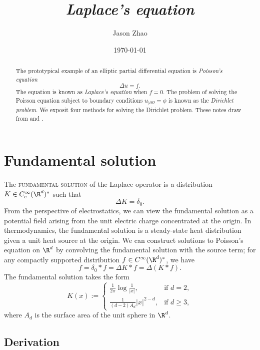 \documentclass[reqno]{amsart}
\title
{
	\emph{Laplace's equation}
}
\author{Jason Zhao}
\date{\today}
\theoremstyle{definition}
\theoremstyle{remark}
\renewcommand{\emph}{\textsc}
\begin{document}
\maketitle

\begin{abstract}
	The prototypical example of an elliptic partial differential equation is \textit{Poisson's equation}
		\[ \Delta u = f. \]
	The equation is known as \textit{Laplace's equation} when $f = 0$. The problem of solving the Poisson equation subject to boundary conditions $u_{|\partial \Omega} = \phi$ is known as the \textit{Dirichlet problem}. We exposit four methods for solving the Dirichlet problem. These notes draw from \cite{GilbargTrudinger2001} and \cite{Evans2010}.
\end{abstract}

\tableofcontents

\section{Fundamental solution}

The \emph{fundamental solution} of the Laplace operator is a distribution $K \in C^\infty_c (\R^d)^*$ such that 
	\[ \Delta K = \delta_0. \]
From the perspective of electrostatics, we can view the fundamental solution as a potential field arising from the unit electric charge concentrated at the origin. In thermodynamics, the fundamental solution is a steady-state heat distribution given a unit heat source at the origin. We can construct solutions to Poisson's equation on $\R^d$ by convolving the fundamental solution with the source term; for any compactly supported distribution $f \in C^\infty (\R^d)^*$, we have
	\[ f = \delta_0 * f = \Delta K * f = \Delta (K * f). \]
The fundamental solution takes the form
	\[ K(x) :=
		\begin{cases}
			\frac{1}{2\pi}\log \frac{1}{|x|}, 		&\text{if } d = 2, \\
			\frac{1}{(d - 2) A_d} |x|^{2 - d} ,	&\text{if } d \geq 3,
		\end{cases}
	 \]
where $A_d$ is the surface area of the unit sphere in $\R^d$. 
	
\subsection{Derivation}
	
\end{document}
